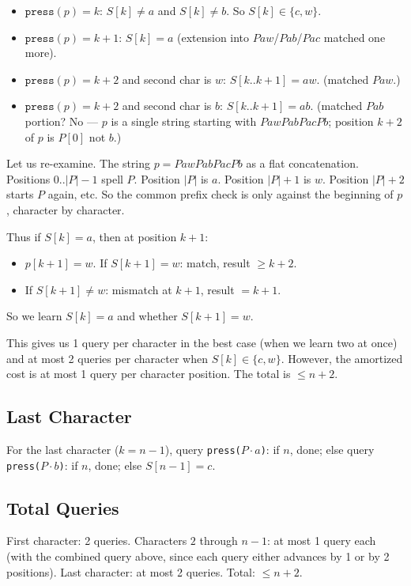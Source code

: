 \documentclass[11pt,a4paper]{article}
\begin{document}
\begin{itemize}
  \item $\texttt{press}(p) = k$: $S[k] \ne a$ and $S[k] \ne b$. So $S[k] \in \{c, w\}$.
  \item $\texttt{press}(p) = k+1$: $S[k] = a$ (extension into $Paw$/$Pab$/$Pac$ matched one more).
  \item $\texttt{press}(p) = k+2$ and second char is $w$: $S[k..k+1] = aw$. (matched $Paw$.)
  \item $\texttt{press}(p) = k+2$ and second char is $b$: $S[k..k+1] = ab$. (matched $Pab$ portion? No --- $p$ is a single string starting with $PawPabPacPb$; position $k+2$ of $p$ is $P[0]$ not $b$.)
\end{itemize}

Let us re-examine. The string $p = PawPabPacPb$ as a flat concatenation. Positions $0..|P|-1$ spell $P$. Position $|P|$ is $a$. Position $|P|+1$ is $w$. Position $|P|+2$ starts $P$ again, etc. So the common prefix check is only against the beginning of $p$, character by character.

Thus if $S[k] = a$, then at position $k+1$:
\begin{itemize}
  \item $p[k+1] = w$. If $S[k+1] = w$: match, result $\ge k+2$.
  \item If $S[k+1] \ne w$: mismatch at $k+1$, result $= k+1$.
\end{itemize}

So we learn $S[k] = a$ and whether $S[k+1] = w$.

This gives us 1 query per character in the best case (when we learn two at once) and at most 2 queries per character when $S[k] \in \{c, w\}$. However, the amortized cost is at most 1 query per character position. The total is $\le n + 2$.

\subsection{Last Character}
For the last character ($k = n-1$), query \texttt{press($P \cdot a$)}: if $n$, done; else query \texttt{press($P \cdot b$)}: if $n$, done; else $S[n-1] = c$.

\subsection{Total Queries}
First character: 2 queries. Characters $2$ through $n-1$: at most 1 query each (with the combined query above, since each query either advances by 1 or by 2 positions). Last character: at most 2 queries. Total: $\le n + 2$.
\end{document}
